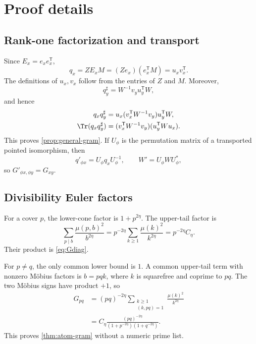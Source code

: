 \section{Proof details}
\label{app:proofs}

\subsection{Rank-one factorization and transport}

Since $E_x=e_xe_x^{\mathsf T}$,
\begin{equation}
 q_x=ZE_xM=(Ze_x)(e_x^{\mathsf T}M)=u_xv_x^{\mathsf T}.
\end{equation}
The definitions of $u_x,v_x$ follow from the entries of $Z$ and $M$.
Moreover,
\begin{equation}
 q_y^\sharp=W^{-1}v_yu_y^{\mathsf T}W,
\end{equation}
and hence
\begin{align}
 q_xq_y^\sharp
 &=u_x(v_x^{\mathsf T}W^{-1}v_y)u_y^{\mathsf T}W,\\
 \Tr(q_xq_y^\sharp)
 &=(v_x^{\mathsf T}W^{-1}v_y)(u_y^{\mathsf T}Wu_x).
\end{align}
This proves \cref{prop:general-gram}.  If $U_\phi$ is the permutation matrix
of a transported pointed isomorphism, then
\begin{equation}
 q'_{\phi x}=U_\phi q_xU_\phi^{-1},
 \qquad
 W'=U_\phi WU_\phi^*,
\end{equation}
so $G'_{\phi x,\phi y}=G_{xy}$.

\subsection{Divisibility Euler factors}

For a cover $p$, the lower-cone factor is $1+p^{2\eta}$.  The upper-tail
factor is
\begin{equation}
 \sum_{p\mid b}\frac{\mu(p,b)^2}{b^{2\eta}}
 =p^{-2\eta}\sum_{k\ge1}\frac{\mu(k)^2}{k^{2\eta}}
 =p^{-2\eta}C_\eta.
\end{equation}
Their product is \eqref{eq:Gdiag}.

For $p\ne q$, the only common lower bound is $1$.  A common upper-tail term
with nonzero M\"obius factors is $b=pqk$, where $k$ is squarefree and coprime
to $pq$.  The two M\"obius signs have product $+1$, so
\begin{align}
 G_{pq}
 &=(pq)^{-2\eta}
   \sum_{\substack{k\ge1\\(k,pq)=1}}
   \frac{\mu(k)^2}{k^{2\eta}}\\
 &=C_\eta\frac{(pq)^{-2\eta}}
 {(1+p^{-2\eta})(1+q^{-2\eta})}.
\end{align}
This proves \cref{thm:atom-gram} without a numeric prime list.

